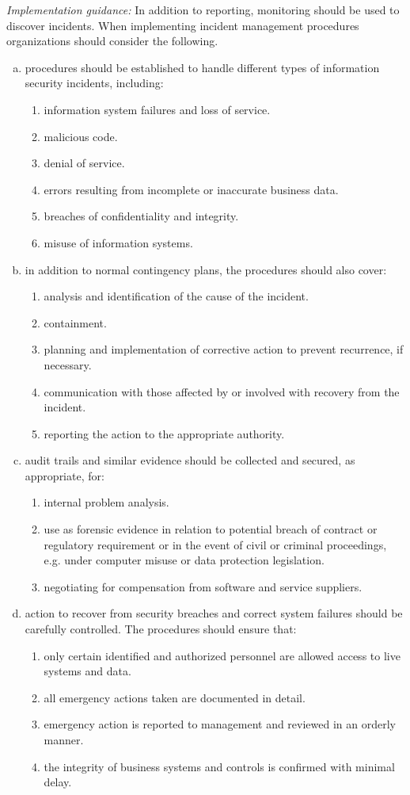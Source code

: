 \emph{Implementation guidance:} In addition to reporting, monitoring should be used to discover incidents. When implementing incident management procedures organizations should consider the following.
\begin{enumerate}[a)]
\item procedures should be established to handle different types of information security incidents, including:
\begin{enumerate}[1)]
\item information system failures and loss of service.
\item malicious code.
\item denial of service.
\item errors resulting from incomplete or inaccurate business data.
\item breaches of confidentiality and integrity.
\item misuse of information systems.
\end{enumerate}
\item in addition to normal contingency plans, the procedures should also cover:
\begin{enumerate}[1)]
\item analysis and identification of the cause of the incident.
\item containment.
\item planning and implementation of corrective action to prevent recurrence, if necessary.
\item communication with those affected by or involved with recovery from the incident.
\item reporting the action to the appropriate authority.
\end{enumerate}
\item audit trails and similar evidence should be collected and secured, as appropriate, for:
\begin{enumerate}[1)]
\item internal problem analysis.
\item use as forensic evidence in relation to potential breach of contract or regulatory requirement or in the event of civil or criminal proceedings, e.g. under computer misuse or data protection legislation.
\item negotiating for compensation from software and service suppliers.
\end{enumerate}
\item action to recover from security breaches and correct system failures should be carefully controlled. The procedures should ensure that:
\begin{enumerate}[1)]
\item only certain identified and authorized personnel are allowed access to live systems and data.
\item all emergency actions taken are documented in detail.
\item emergency action is reported to management and reviewed in an orderly manner.
\item the integrity of business systems and controls is confirmed with minimal delay.
\end{enumerate}
\end{enumerate}

